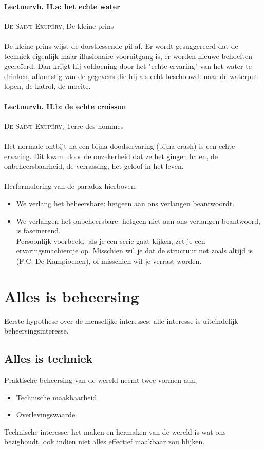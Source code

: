 \documentclass[11pt,a4paper]{article}
\begin{document}
\paragraph{Lectuurvb. II.a: het echte water} \textsc{De Saint-Exup\'ery}, De kleine prins
\\ \\
De kleine prins wijst de dorstlessende pil af. Er wordt gesuggereerd dat de techniek eigenlijk maar illusionaire vooruitgang is, er worden nieuwe behoeften gecre\"eerd. Dan krijgt hij voldoening door het "echte ervaring" van het water te drinken, afkomstig van de gegevens die hij als echt beschouwd: naar de waterput lopen, de katrol, de moeite.

\paragraph{Lectuurvb. II.b: de echte croisson} \textsc{De Saint-Exup\'ery}, Terre des hommes
\\ \\
Het normale ontbijt na een bijna-doodservaring (bijna-crash) is een echte ervaring. Dit kwam door de onzekerheid dat ze het gingen halen, de onbeheersbaarheid, de verrassing, het geloof in het leven.

\paragraph{}
Herformulering van de paradox hierboven:

\begin{itemize}
	\item We verlang het beheersbare: hetgeen aan ons verlangen beantwoordt. 
	\item We verlangen het onbeheersbare: hetgeen niet aan ons verlangen beantwoord, is fascinerend.
	\\ Persoonlijk voorbeeld: als je een serie gaat kijken, zet je een ervaringsmachientje op. Misschien wil je dat de structuur net zoals altijd is (F.C. De Kampioenen), of misschien wil je verrast worden.
\end{itemize}

\section{Alles is beheersing}
Eerste hypothese over de menselijke interesses: alle interesse is uiteindelijk beheersingsinteresse.

\subsection{Alles is techniek}
Praktische beheersing van de wereld neemt twee vormen aan:
\begin{itemize}
\item Technische maakbaarheid
\item Overlevingswaarde
\end{itemize}
Technische interesse: het maken en hermaken van de wereld is wat ons bezighoudt, ook indien niet alles effectief maakbaar zou blijken.
\end{document}
